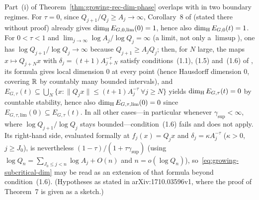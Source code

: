 \begin{remark}\label{rem:growing-BLR}
Part~(i) of Theorem~\ref{thm:growing-rec-dim-phase} overlaps with \cite{BLR} in two
boundary regimes. For $\tau=0$, since $Q_{j+1}/Q_j\ge A_j\to\infty$, Corollary~8 of
\cite{BLR} (stated there without proof) already gives
$\dim_{\mathrm{H}} E_{G,0,\mathrm{lim}}(0)=1$, hence also
$\dim_{\mathrm{H}} E_{G,0}(t)=1$. For $0<\tau<1$ and $\lim_{j\to\infty}\log A_j/\log Q_j=\infty$
(a limit, not only a $\limsup$), one has $\log Q_{j+1}/\log Q_j\to\infty$ because
$Q_{j+1}\ge A_jQ_j$; then, for $N$ large, the maps $x\mapsto Q_{j+N}x$ with
$\delta_j=(t+1)A_{j+N}^{-\tau}$ satisfy conditions~(1.1), (1.5) and~(1.6) of
\cite[Theorem~7]{BLR}, its formula gives local dimension $0$ at every point (hence
Hausdorff dimension $0$, covering $\mathbb{R}$ by countably many bounded intervals), and
$E_{G,\tau}(t)\subseteq\bigcup_N\{x:\|Q_jx\|\le(t+1)A_j^{-\tau}\ \forall j\ge N\}$
yields $\dim_{\mathrm{H}} E_{G,\tau}(t)=0$ by countable stability, hence also
$\dim_{\mathrm{H}} E_{G,\tau,\mathrm{lim}}(0)=0$ since $E_{G,\tau,\mathrm{lim}}(0)\subseteq E_{G,\tau}(t)$.
In all other cases---in
particular whenever $\gamma_{\sup}<\infty$, where $\log Q_{j+1}/\log Q_j$ stays
bounded---condition~(1.6) fails and \cite[Theorem~7]{BLR} does not apply. Its
right-hand side, evaluated formally at $f_j(x)=Q_jx$ and $\delta_j=\kappa A_j^{-\tau}$
($\kappa>0$, $j\ge J_0$), is
nevertheless $(1-\tau)/(1+\tau\gamma_{\sup})$ (using $\log Q_n=\sum_{J_0\le j<n}\log A_j+O(n)$
and $n=o(\log Q_n)$), so~\eqref{eq:growing-subcritical-dim} may be read as an extension
of that formula beyond condition~(1.6). (Hypotheses as stated in arXiv:1710.03596v1, where the proof of Theorem~7 is
given as a sketch.)
\end{remark}

